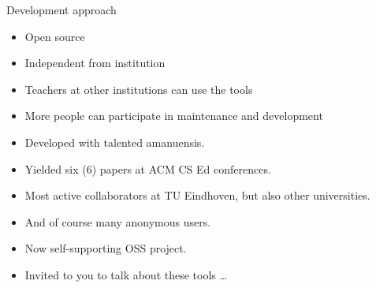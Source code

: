 \begin{frame}[fragile]
  \begin{block}{Development approach}
    \begin{itemize}
      \item Open source
      \item Independent from institution
    \end{itemize}
  \end{block}

  \pause

  \begin{example}[Advantages]
    \begin{itemize}
      \item Teachers at other institutions can use the tools
      \item More people can participate in maintenance and 
        development
    \end{itemize}
  \end{example}
\end{frame}

\begin{frame}
  \begin{example}[RepoBee]
    \begin{itemize}
      \item Developed with talented amanuensis.
      \item Yielded six (6) papers at ACM CS Ed conferences.
      \item Most active collaborators at TU Eindhoven, but also other 
        universities.
      \item And of course many anonymous users.
      \item Now self-supporting OSS project.
    \end{itemize}
  \end{example}

  \pause

  \begin{example}
    \begin{itemize}
      \item Invited to you to talk about these tools \dots
    \end{itemize}
  \end{example}
\end{frame}

